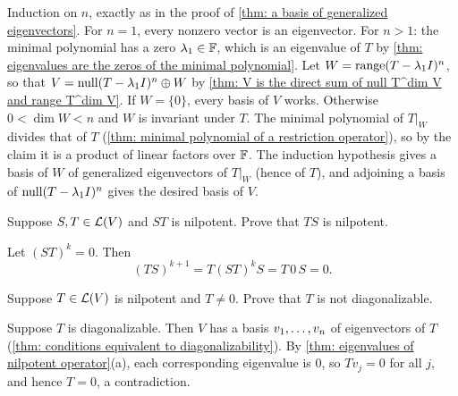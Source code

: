 \begin{xrcs}
\begin{xprf}
  \Leftarrowdirection Induction on $n$, exactly as in the proof of \ref{thm: a basis of generalized eigenvectors}. For $n = 1$, every nonzero vector is an eigenvector. For $n > 1$: the minimal polynomial has a zero $\lambda_1 \in \mathbb{F}$, which is an eigenvalue of $T$ by \ref{thm: eigenvalues are the zeros of the minimal polynomial}. Let $W = \operatorname{range} (T - \lambda_1 I)^n$, so that $V = \operatorname{null} (T - \lambda_1 I)^n \oplus W$ by \ref{thm: V is the direct sum of null T^dim V and range T^dim V}. If $W = \{0\}$, every basis of $V$ works. Otherwise $0 < \dim W < n$ and $W$ is invariant under $T$. The minimal polynomial of $T|_W$ divides that of $T$ (\ref{thm: minimal polynomial of a restriction operator}), so by the claim it is a product of linear factors over $\mathbb{F}$. The induction hypothesis gives a basis of $W$ of generalized eigenvectors of $T|_W$ (hence of $T$), and adjoining a basis of $\operatorname{null} (T - \lambda_1 I)^n$ gives the desired basis of $V$.
\end{xprf}
\end{xrcs}

\begin{xrcs}
  Suppose $S, T \in \mathcal{L}(V)$ and $ST$ is nilpotent. Prove that $TS$ is nilpotent.

\begin{xprf}
  Let $(ST)^k = 0$. Then
  \begin{equation}
    (TS)^{k+1} = T (ST)^k S = T \, 0 \, S = 0.
  \end{equation}
  \vspace{-\baselineskip}
\end{xprf}
\end{xrcs}

\begin{xrcs}
  Suppose $T \in \mathcal{L}(V)$ is nilpotent and $T \neq 0$. Prove that $T$ is not diagonalizable.

\begin{xprf}
  Suppose $T$ is diagonalizable. Then $V$ has a basis $v_1, \dots, v_n$ of eigenvectors of $T$ (\ref{thm: conditions equivalent to diagonalizability}). By \ref{thm: eigenvalues of nilpotent operator}(a), each corresponding eigenvalue is $0$, so $T v_j = 0$ for all $j$, and hence $T = 0$, a contradiction.
\end{xprf}
\end{xrcs}

